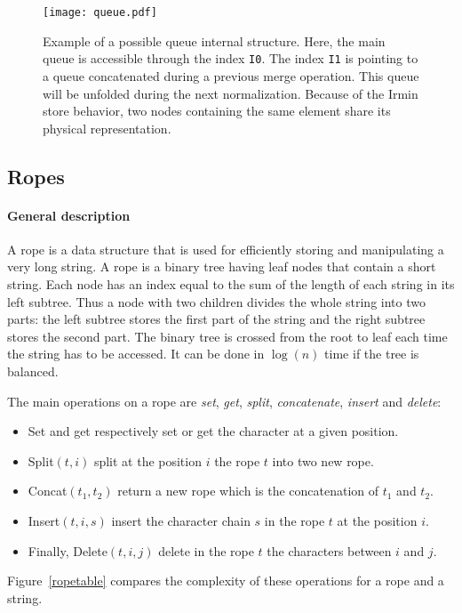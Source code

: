 \documentclass{article}
\newcommand{\irmin}{Irmin\xspace}
\newcommand{\code}[1]{\texttt{#1}}
\begin{document}
\begin{figure}[hbt]
\centering
\texttt{[image: queue.pdf]}
\caption{Example of a possible queue internal structure. Here, the main queue is accessible through the index \code{I0}. The index \code{I1} is pointing to a queue concatenated during a previous merge operation. This queue will be unfolded during the next normalization. Because of the \irmin store behavior,  two nodes containing the same element share its physical representation.}
\label{queuegraph}
\end{figure}


\subsection{Ropes}

\paragraph{General description}
A rope is a data structure that is used for efficiently storing and manipulating a very long string.
A rope is a binary tree having leaf nodes that contain a short string.
Each node has an index equal to the sum of the length of each string in its left subtree.
Thus a node with two children divides the whole string into two parts: the left subtree stores the first part of the string and the right subtree stores the second part.
The binary tree is crossed from the root to leaf each time the string has to be accessed.
It can be done in $\log (n)$ time if the tree is balanced.

The main operations on a rope are \emph{set}, \emph{get}, \emph{split}, \emph{concatenate}, \emph{insert} and \emph{delete}:
\begin{itemize}
	\item Set and get respectively set or get the character at a given position.
	\item Split$(t, i)$ split at the position $i$ the rope $t$ into two new rope.
	\item Concat$(t_1, t_2)$ return a new rope which is the concatenation of $t_1$ and $t_2$.
	\item Insert$(t, i, s)$ insert the character chain $s$ in the rope $t$ at the position $i$.
	\item Finally, Delete$(t, i, j)$ delete in the rope $t$ the characters between $i$ and $j$.
\end{itemize}
Figure~\ref{ropetable} compares the complexity of these operations for a rope and a string.
\end{document}
